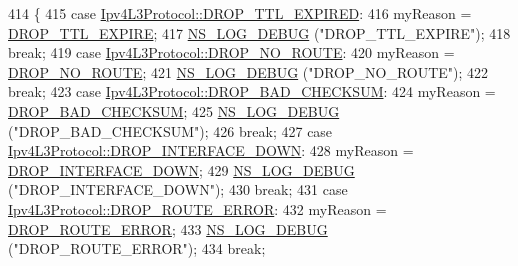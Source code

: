 \begin{DoxyCode}
414         \{
415         \textcolor{keywordflow}{case} \hyperlink{classns3_1_1Ipv4L3Protocol_a05e7403d60c79529257c4cffdd994da1a95ecb5b7c1affd7ca7a6d3d34c38cd40}{Ipv4L3Protocol::DROP\_TTL\_EXPIRED}:
416           myReason = \hyperlink{classns3_1_1Ipv4FlowProbe_a035ac54633cca2eec144e14f0dcf4179a17b6754e3723d8983e17dfee84f2edd4}{DROP\_TTL\_EXPIRE};
417           \hyperlink{group__logging_ga413f1886406d49f59a6a0a89b77b4d0a}{NS\_LOG\_DEBUG} (\textcolor{stringliteral}{"DROP\_TTL\_EXPIRE"});
418           \textcolor{keywordflow}{break};
419         \textcolor{keywordflow}{case} \hyperlink{classns3_1_1Ipv4L3Protocol_a05e7403d60c79529257c4cffdd994da1a6934d63c397ae1ec077fdfcdeb90eb40}{Ipv4L3Protocol::DROP\_NO\_ROUTE}:
420           myReason = \hyperlink{classns3_1_1Ipv4FlowProbe_a035ac54633cca2eec144e14f0dcf4179a788583a6bda127b650efb4ad2f194dfa}{DROP\_NO\_ROUTE};
421           \hyperlink{group__logging_ga413f1886406d49f59a6a0a89b77b4d0a}{NS\_LOG\_DEBUG} (\textcolor{stringliteral}{"DROP\_NO\_ROUTE"});
422           \textcolor{keywordflow}{break};
423         \textcolor{keywordflow}{case} \hyperlink{classns3_1_1Ipv4L3Protocol_a05e7403d60c79529257c4cffdd994da1a14938788d12f864657e5a3aa5d3e26fd}{Ipv4L3Protocol::DROP\_BAD\_CHECKSUM}:
424           myReason = \hyperlink{classns3_1_1Ipv4FlowProbe_a035ac54633cca2eec144e14f0dcf4179a0f8cc3d4cdef6bd11db276991ba5be83}{DROP\_BAD\_CHECKSUM};
425           \hyperlink{group__logging_ga413f1886406d49f59a6a0a89b77b4d0a}{NS\_LOG\_DEBUG} (\textcolor{stringliteral}{"DROP\_BAD\_CHECKSUM"});
426           \textcolor{keywordflow}{break};
427         \textcolor{keywordflow}{case} \hyperlink{classns3_1_1Ipv4L3Protocol_a05e7403d60c79529257c4cffdd994da1a8f40f145dce3e9f21e1218ce125a048d}{Ipv4L3Protocol::DROP\_INTERFACE\_DOWN}:
428           myReason = \hyperlink{classns3_1_1Ipv4FlowProbe_a035ac54633cca2eec144e14f0dcf4179a70419383e53bbcc568c10c69f5084f6f}{DROP\_INTERFACE\_DOWN};
429           \hyperlink{group__logging_ga413f1886406d49f59a6a0a89b77b4d0a}{NS\_LOG\_DEBUG} (\textcolor{stringliteral}{"DROP\_INTERFACE\_DOWN"});
430           \textcolor{keywordflow}{break};
431         \textcolor{keywordflow}{case} \hyperlink{classns3_1_1Ipv4L3Protocol_a05e7403d60c79529257c4cffdd994da1aeb35be325e705553daacbf36f035c8f5}{Ipv4L3Protocol::DROP\_ROUTE\_ERROR}:
432           myReason = \hyperlink{classns3_1_1Ipv4FlowProbe_a035ac54633cca2eec144e14f0dcf4179a0a724e0ab6697453a260527f3a7a6893}{DROP\_ROUTE\_ERROR};
433           \hyperlink{group__logging_ga413f1886406d49f59a6a0a89b77b4d0a}{NS\_LOG\_DEBUG} (\textcolor{stringliteral}{"DROP\_ROUTE\_ERROR"});
434           \textcolor{keywordflow}{break};

\end{DoxyCode}
